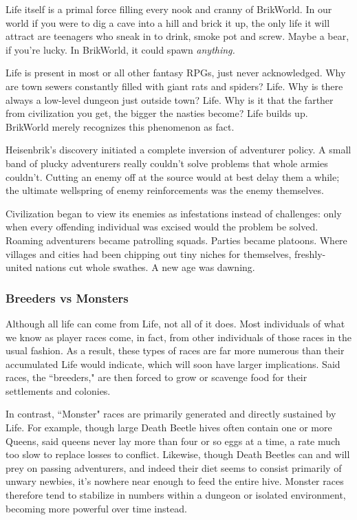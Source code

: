 \documentclass[12pt,a4paper,twocolumn]{article}
\begin{document}
Life itself is a primal force filling every nook and cranny of BrikWorld.  In our world if you were to dig a cave into a hill and brick it up, the only life it will attract are teenagers who sneak in to drink, smoke pot and screw.  Maybe a bear, if you're lucky.  In BrikWorld, it could spawn {\em anything.}  

Life is present in most or all other fantasy RPGs, just never acknowledged.  Why are town sewers constantly filled with giant rats and spiders?  Life.  Why is there always a low-level dungeon just outside town?  Life.  Why is it that the farther from civilization you get, the bigger the nasties become?  Life builds up.  BrikWorld merely recognizes this phenomenon as fact.

Heisenbrik's discovery initiated a complete inversion of adventurer policy.  A small band of plucky adventurers really couldn't solve problems that whole armies couldn't.  Cutting an enemy off at the source would at best delay them a while; the ultimate wellspring of enemy reinforcements was the enemy themselves.  

Civilization began to view its enemies as infestations instead of challenges: only when every offending individual was excised would the problem be solved.  Roaming adventurers became patrolling squads.  Parties became platoons.  Where villages and cities had been chipping out tiny niches for themselves, freshly-united nations cut whole swathes.  A new age was dawning.
\subsubsection{Breeders vs Monsters}
Although all life can come from Life, not all of it does.  Most individuals of what we know as player races come, in fact, from other individuals of those races in the usual fashion.  As a result, these types of races are far more numerous than their accumulated Life would indicate, which will soon have larger implications.  Said races, the ``breeders," are then forced to grow or scavenge food for their settlements and colonies.

In contrast, ``Monster" races are primarily generated and directly sustained by Life.  For example, though large Death Beetle hives often contain one or more Queens, said queens never lay more than four or so eggs at a time, a rate much too slow to replace losses to conflict.  Likewise, though Death Beetles can and will prey on passing adventurers, and indeed their diet seems to consist primarily of unwary newbies, it's nowhere near enough to feed the entire hive.  Monster races therefore tend to stabilize in numbers within a dungeon or isolated environment, becoming more powerful over time instead.
\end{document}
